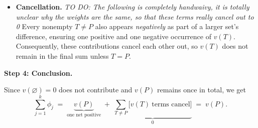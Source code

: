 \documentclass{article}
\begin{document}
\begin{proofsketch}
\begin{itemize}
    \item \textbf{Cancellation.} 
    \textit{TO DO: The following is completely handwaivy, it is totally unclear why the weights are the same, so that these terms really cancel out to 0}
    Every nonempty \(T \neq P\) also appears \emph{negatively} as part of a larger set’s difference, ensuring one positive and one negative occurrence of $v(T)$. Consequently, these contributions cancel each other out, so \(v(T)\) does not remain in the final sum unless $T=P$.
\end{itemize}
\medskip
\noindent
\textbf{Step 4: Conclusion.}

Since $v(\varnothing) = 0$ does not contribute and $v(P)$ remains once in total, we get
\[
\sum_{j=1}^k \phi_j 
\;=\;
\underbrace{v(P)}_{\text{one net positive}} 
\;+\; 
\underbrace{\sum_{T \neq P} \bigl[v(T)\ \text{terms cancel}\bigr]}_{0} 
\;=\;
v(P).
\]
\qedhere
\end{proofsketch}






\end{document}
